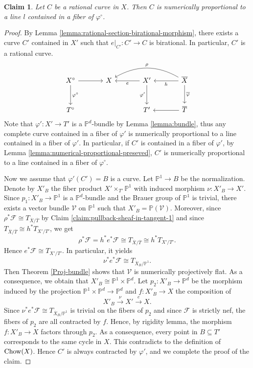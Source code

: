 \documentclass[english,reqno]{amsart}
\newcommand\bbP{{\mathbb P}}
\newcommand\sF{{\mathscr F}}
\newcommand\sV{{\mathscr V}}
\newcommand{\Chow}[1]{\ensuremath{\mbox{\rm Chow}(#1)}}
\theoremstyle{plain}
\newtheorem{claim}[thm]{Claim}
\theoremstyle{definition}
\numberwithin{equation}{section} %
\begin{document}
\begin{claim}
	\label{claim:extremal-ray-F=T_F}
	Let $C$ be a  rational curve in $X$. Then $C$ is numerically proportional to a line $l$ contained in a fiber  of $\varphi^\circ$.
\end{claim}

\begin{proof}
	By Lemma \ref{lemma:rational-section-birational-morphism}, there exists a curve $C'$ contained in $X'$ such that $e\vert_{C'}\colon C'\rightarrow C$ is birational. In particular, $C'$ is a rational curve.
	\begin{equation*}
	\begin{tikzcd}[column sep=large, row sep=large]
	X^\circ \dar{\varphi^\circ}\rar &
	X & X' \lar{e} \dar[swap]{\varphi'}
	& \overline{X} \lar{h} \arrow[bend right]{ll}[swap]{\rho} \dar{\overline{\varphi}}
	\\
	T^\circ & &
	T' &
	\overline{T} \lar
	\end{tikzcd}
	\end{equation*}
	Note that $\varphi'\colon X'\rightarrow T'$ is a $\bbP^d$-bundle by Lemma \ref{lemma:bundle}, thus any complete curve contained in a fiber  of $\varphi'$ is numerically proportional to a line contained in a fiber of $\varphi'$.
	In particular, if $C'$ is contained in a fiber  of $\varphi'$, by Lemma \ref{lemma:numerical-proportional-preseved}, $C'$ is numerically proportional to a line contained in a fiber  of $\varphi^\circ$.
	
	Now we assume  that $\varphi'(C')=B$ is a curve.
	Let $\bbP^1\rightarrow B$ be the normalization. Denote by $X'_B$ the fiber product $X'\times_{T'}\bbP^1$ with induced morphism $\nu\colon X'_B\rightarrow X'$.
	Since $p_1\colon X'_B\rightarrow \bbP^1$ is a $\bbP^d$-bundle and the Brauer group of $\bbP^1$ is trivial,  there exists a vector bundle $\sV$  on $\bbP^1$ such that $X'_B= \bbP(\sV)$.
	Moreover, since  $\rho^*\sF \cong T_{\overline{X}/\overline{T}}$ by Claim \ref{claim:pullback-sheaf-in-tangent-1} and since $T_{\overline{X}/\overline{T}}\cong  h^*T_{X'/T'}$, we get
	\[
	\rho^*\sF = h^*e^*\sF  \cong T_{\overline{X}/\overline{T}}  \cong h^*T_{X'/T'}.
	\]
	Hence  $e^*\sF \cong T_{X'/T'}$. In particular, it yields
	\[
	\nu^*e^*\sF \cong  T_{\overline{X}_B/\bbP^1}.
	\]
	Then   Theorem \ref{Proj-bundle} shows that $\sV$ is numerically projectively flat. As a consequence, we obtain that $X'_{B}\cong  \bbP^1\times \bbP^d$. Let $p_2\colon X'_{B} \to \bbP^d$ be the morphism induced by the projection $\bbP^1\times \bbP^d\rightarrow \bbP^d$ and $f\colon X'_{B} \to X$ the composition of
	\[
	X'_B\xrightarrow{\nu} X'\xrightarrow{e} X.
	\]
	Since $\nu^*e^*\sF \cong  T_{\overline{X}_B/\bbP^1}$ is trivial on the fibers of $p_2$  and since $\sF$ is  strictly nef, the fibers of $p_2$ are all contracted by $f$.
	Hence, by rigidity lemma, the morphism $f\colon {X}'_B\rightarrow X$ factors through $p_2$. As a consequence, every point in $B\subseteq T'$ corresponds to the same cycle in $X$. This contradicts to the definition of $\Chow{X}$. Hence $C'$ is always contracted by $\varphi'$, and we complete the proof of the claim.
\end{proof}
\end{document}
